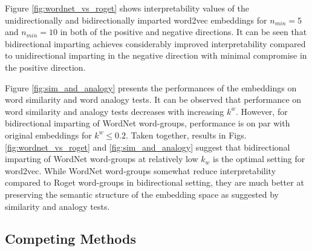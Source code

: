 \documentclass[11pt,a4paper]{article}
\begin{document}
Figure \ref{fig:wordnet_vs_roget} shows interpretability values of the unidirectionally and bidirectionally imparted word2vec embeddings for $n_{min} = 5$ and $n_{min} = 10$ in both of the positive and negative directions. It can be seen that bidirectional imparting achieves considerably improved interpretability compared to unidirectional imparting in the negative direction with minimal compromise in the positive direction.


Figure \ref{fig:sim_and_analogy} presents the performances of the embeddings on word similarity and word analogy tests. It can be observed that performance on word similarity and analogy tests decreases with increasing $k^w$.  However, for bidirectional imparting of WordNet word-groups, performance is on par with original embeddings for $k^w \leq 0.2$. Taken together, results in Figs. \ref{fig:wordnet_vs_roget} and \ref{fig:sim_and_analogy} suggest that bidirectional imparting of WordNet word-groups at relatively low $k_w$ is the optimal setting for word2vec. While WordNet word-groups somewhat reduce interpretability compared to Roget word-groups in bidirectional setting, they are much better at preserving the semantic structure of the embedding space as suggested by similarity and analogy tests.
 
 
 
 
 
 
 
 
 \subsection{Competing Methods}
 \label{app:competing_methods}
 
\end{document}
